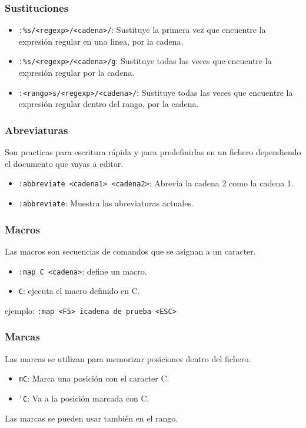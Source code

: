 \documentclass[10pt]{beamer}
\begin{document}
  \begin{frame}[containsverbatim]
    \frametitle{Sustituciones}
    \begin{itemize}
      \item \verb+:%s/<regexp>/<cadena>/+: Sustituye la primera vez que encuentre la expresión regular en una linea, por la cadena.
      \item \verb+:%s/<regexp>/<cadena>/g+: Sustituye todas las veces que encuentre la expresión regular por la cadena.
      \item \verb+:<rango>s/<regexp>/<cadena>/+: Sustituye todas las veces que encuentre la expresión regular dentro del rango, por la cadena.
    \end{itemize}
  \end{frame}
  
  \begin{frame}[containsverbatim]
    \frametitle{Abreviaturas}
    Son practicas para escritura rápida y para predefinirlas en un fichero dependiendo el documento que vayas a editar.
    \begin{itemize}
      \item \verb+:abbreviate <cadena1> <cadena2>+: Abrevia la cadena 2 como la cadena 1.
      \item \verb+:abbreviate+: Muestra las abreviaturas actuales.
    \end{itemize}
  \end{frame}
  
  \begin{frame}[containsverbatim]
    \frametitle{Macros}
    Las macros son secuencias de comandos que se asignan a un caracter.
    \begin{itemize}
      \item \verb+:map C <cadena>+: define un macro.
      \item \verb+C+: ejecuta el macro definido en C.
    \end{itemize}
    ejemplo: \verb+:map <F5> icadena de prueba <ESC>+
  \end{frame}
  
  \begin{frame}[containsverbatim]
    \frametitle{Marcas}
    Las marcas se utilizan para memorizar posiciones dentro del fichero.
    \begin{itemize}
      \item \verb+mC+: Marca una posición con el caracter C.
      \item \verb+'C+: Va a la posición marcada con C.
    \end{itemize}
    Las marcas se pueden usar también en el rango.
  \end{frame}
  
\end{document}
